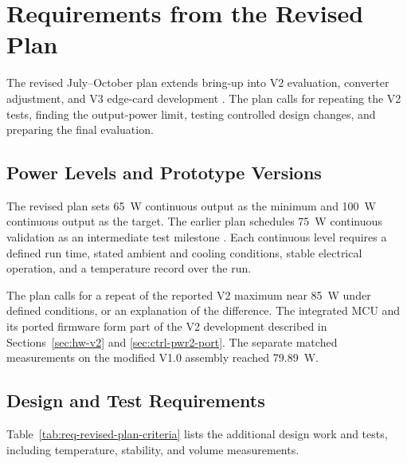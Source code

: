 \section{Requirements from the Revised Plan}
\label{sec:revised-plan-criteria}

The revised July--October plan extends bring-up into V2 evaluation, converter adjustment, and V3 edge-card development \cite{projectOctoberPlan}. The plan calls for repeating the V2 tests, finding the output-power limit, testing controlled design changes, and preparing the final evaluation.

\subsection{Power Levels and Prototype Versions}

The revised plan sets \SI{65}{\watt} continuous output as the minimum and \SI{100}{\watt} continuous output as the target. The earlier plan schedules \SI{75}{\watt} continuous validation as an intermediate test milestone \cite{projectEarlierPlan}. Each continuous level requires a defined run time, stated ambient and cooling conditions, stable electrical operation, and a temperature record over the run.

The plan calls for a repeat of the reported V2 maximum near \SI{85}{\watt} under defined conditions, or an explanation of the difference. The integrated MCU and its ported firmware form part of the V2 development described in Sections~\ref{sec:hw-v2} and \ref{sec:ctrl-pwr2-port}. The separate matched measurements on the modified V1.0 assembly reached \SI{79.89}{\watt}.

\subsection{Design and Test Requirements}

Table~\ref{tab:req-revised-plan-criteria} lists the additional design work and tests, including temperature, stability, and volume measurements.

